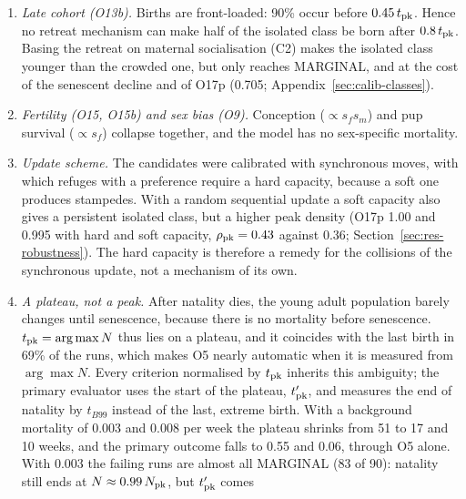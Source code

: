 \begin{enumerate}
    asynchronous update (mean generation of the births 1.22--1.43), and with five times less crowding damage. It is
    not caused by fast deterioration: deterioration takes of the order of one generation time ($\Gamma\approx1.1$; 0.7 with the mean age of the mothers at birth as generation time), and slowing
    it barely deepens the boom (Section~\ref{sec:model-groups}).
  \item \emph{Late cohort (O13b).} Births are front-loaded: 90\% occur before $0.45\,t_{\rm pk}$. Hence no
    retreat mechanism can make half of the isolated class be born after $0.8\,t_{\rm pk}$. Basing the
    retreat on maternal socialisation (\textsf{C2}) makes the isolated class younger than the crowded one,
    but only reaches MARGINAL, and at the cost of the senescent decline and of O17p (0.705;
    Appendix~\ref{sec:calib-classes}).
  \item \emph{Fertility (O15, O15b) and sex bias (O9).} Conception ($\propto s_fs_m$) and pup survival
    ($\propto s_f$) collapse together, and the model has no sex-specific mortality.
  \item \emph{Update scheme.} The candidates were calibrated with synchronous moves, with which refuges with a
    preference require a hard capacity, because a soft one produces stampedes. With a random sequential update a
    soft capacity also gives a persistent isolated class, but a higher peak density (O17p 1.00 and 0.995 with hard
    and soft capacity, $\rho_{\rm pk}=0.43$ against 0.36; Section~\ref{sec:res-robustness}). The hard capacity is
    therefore a remedy for the collisions of the synchronous update, not a mechanism of its own.
  \item \emph{A plateau, not a peak.} After natality dies, the young adult population barely changes until
    senescence, because there is no mortality before senescence. $t_{\rm pk}=\arg\max N$ thus lies on a plateau,
    and it coincides with the last birth in 69\% of the runs, which makes O5 nearly automatic when it is measured
    from $\arg\max N$. Every criterion normalised by $t_{\rm pk}$ inherits this ambiguity; the primary evaluator
    uses the start of the plateau, $t'_{\rm pk}$, and measures the end of natality by $t_{B99}$ instead of
    the last, extreme birth. With a background mortality of 0.003 and 0.008 per week the plateau shrinks from 51 to
    17 and 10 weeks, and the primary outcome falls to 0.55 and 0.06, through O5 alone. With 0.003 the failing runs
    are almost all MARGINAL (83 of 90): natality still ends at $N\approx0.99\,N_{\rm pk}$, but $t'_{\rm pk}$ comes

\end{enumerate}
